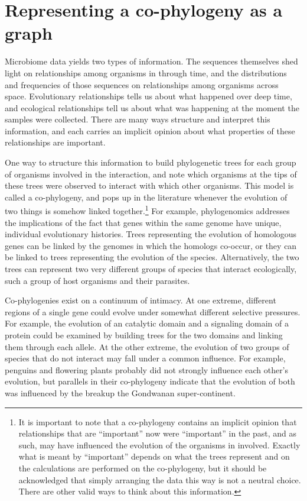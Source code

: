 \documentclass[
10pt, %
a4paper, %
oneside, %
headinclude,footinclude, %
BCOR5mm, %
]{scrartcl}
\begin{document}
\section{Representing a co-phylogeny as a graph}

Microbiome data yields two types of information. The sequences themselves shed light on relationships among organisms in through time, and the distributions and frequencies of those sequences on relationships among organisms across space. Evolutionary relationships tells us about what happened over deep time, and ecological relationships tell us about what was happening at the moment the samples were collected. There are many ways structure and interpret this information, and each carries an implicit opinion about what properties of these relationships are important.

One way to structure this information to build phylogenetic trees for each group of organisms involved in the interaction, and note which organisms at the tips of these trees were observed to interact with which other organisms. This model is called a co-phylogeny, and pops up in the literature whenever the evolution of two things is somehow linked together.\footnote{It is important to note that a co-phylogeny contains an implicit opinion that relationships that are ``important'' now were ``important'' in the past, and as such, may have influenced the evolution of the organisms in involved. Exactly what is meant by ``important'' depends on what the trees represent and on the calculations are performed on the co-phylogeny, but it should be acknowledged that simply arranging the data this way is not a neutral choice. There are other valid ways to think about this information.} For example, phylogenomics addresses the implications of the fact that genes within the same genome have unique, individual evolutionary histories. Trees representing the evolution of homologous genes can be linked by the genomes in which the homologs co-occur, or they can be linked to trees representing the evolution of the species. Alternatively, the two trees can represent two very different groups of species that interact ecologically, such a group of host organisms and their parasites.

Co-phylogenies exist on a continuum of intimacy. At one extreme, different regions of a single gene could evolve under somewhat different selective pressures. For example, the evolution of an catalytic domain and a signaling domain of a protein could be examined by building trees for the two domains and linking them through each allele. At the other extreme, the evolution of two groups of species that do not interact may fall under a common influence. For example, penguins and flowering plants probably did not strongly influence each other's evolution, but parallels in their co-phylogeny indicate that the evolution of both was influenced by the breakup the Gondwanan super-continent. 
\end{document}

